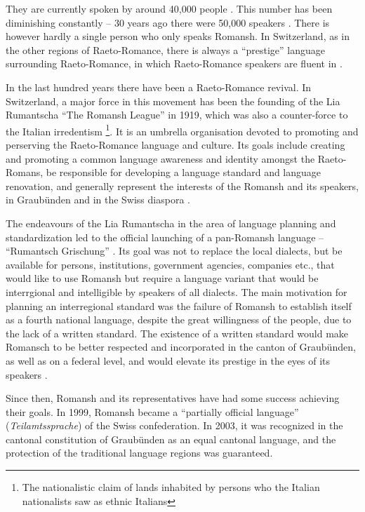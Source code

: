They are currently spoken by around 40,000 people \autocite{bundesamt2020}. 
This number has been diminishing constantly -- 30 years ago there were 50,000 speakers \autocite{haiman1992}. 
There is however hardly a single person who only speaks Romansh. 
In Switzerland, as in the other regions of Raeto-Romance, there is always a \enquote{prestige} language surrounding Raeto-Romance, in which Raeto-Romance speakers are fluent in \autocite[3]{haiman1992}. 

In the last hundred years there have been a Raeto-Romance revival. 
In Switzerland, a major force in this movement has been the founding of the Lia Rumantscha \enquote{The Romansh League} in 1919, which was also a counter-force to the Italian irredentism \footnote{The nationalistic claim of lands inhabited by persons who the Italian nationalists saw as ethnic Italians}. 
It is an umbrella organisation devoted to promoting and perserving the Raeto-Romance language and culture. Its goals include creating and promoting a common language awareness and identity amongst the Raeto-Romans, be responsible for developing a language standard and language renovation, and generally represent the interests of the Romansh and its speakers, in Graubünden and in the Swiss diaspora \autocite{dazzi2012}.

The endeavours of the Lia Rumantscha in the area of language planning and standardization led to the official launching of a pan-Romansh language -- \enquote{Rumantsch Grischung} \autocite[5]{haiman1992}. 
Its goal was not to replace the local dialects, but be available for persons, institutions, government agencies, companies etc., that would like to use Romansh but require a language variant that would be interrgional and intelligible by speakers of all dialects. The main motivation for planning an interregional standard was the failure of Romansh to establish itself as a fourth national language, despite the great willingness of the people, due to the lack of a written standard. 
The existence of a written standard would make Romansch to be better respected and incorporated in the canton of Graubünden, as well as on a federal level, and would elevate its prestige in the eyes of its speakers \autocite{schmid1982}.

Since then, Romansh and its representatives have had some success achieving their goals. 
In 1999, Romansh became a \enquote{partially official language} (\emph{Teilamtssprache}) of the Swiss confederation. 
In 2003, it was recognized in the cantonal constitution of Graubünden as an equal cantonal language, and the protection of the traditional language regions was guaranteed.




